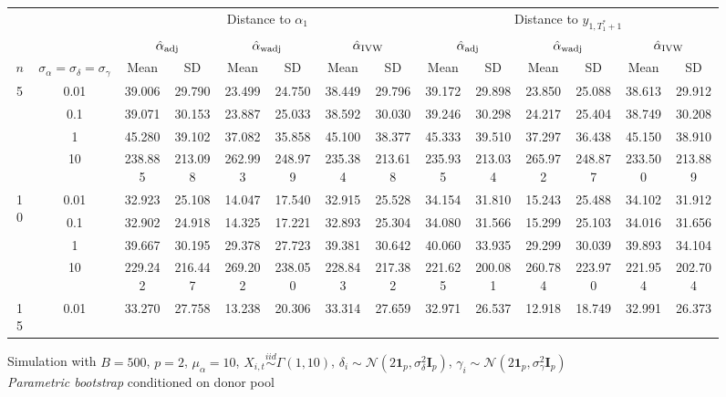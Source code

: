 \documentclass[11pt]{article}
\newcommand{\simiid}{\stackrel{iid}{\sim}} %
\def\normal#1#2{\mathcal{N}(#1,#2)} %
\theoremstyle{definition}
\begin{document}
\begin{sidewaysfigure}
\centering
\caption{Simulation  with $B = 500$, $p = 2$, $\mu_{\alpha}=10$, $X_{i,t} \simiid \Gamma(1,10)$, $\delta_i \sim \normal{2\mathbf{1}_p}{\sigma^2_{\delta}\mathbf{I}_p}$, $\gamma_i \sim \normal{2\mathbf{1}_p}{\sigma^2_{\gamma}\mathbf{I}_p}$ \\ \emph{Parametric bootstrap} conditioned on donor pool}
\begin{tabular}{cc|cccccc|cccccc}
  && \multicolumn{6}{c|}{Distance to $\alpha_1$}  & \multicolumn{6}{c}{Distance to $y_{1, T_1^*+1}$}  \\ 
   & & \multicolumn{2}{c}{$\hat{\alpha}_{\rm adj}$}  & \multicolumn{2}{c}{$\hat{\alpha}_{\rm wadj}$} & \multicolumn{2}{c|}{$\hat{\alpha}_{\rm IVW}$} & \multicolumn{2}{c}{$\hat{\alpha}_{\rm adj}$} & \multicolumn{2}{c}{$\hat{\alpha}_{\rm wadj}$}  & \multicolumn{2}{c}{$\hat{\alpha}_{\rm IVW}$}   \\ 
  $n$   & $\sigma_{\alpha} = \sigma_{\delta}=\sigma_{\gamma}$  & Mean & SD & Mean & SD & Mean & SD & Mean & SD & Mean & SD & Mean & SD  \\[.3cm]  
    \hline
 \multirow{4}{*}{5}  & 0.01 & 39.006 & 29.790 & 23.499 & 24.750 & 38.449 & 29.796 & 39.172 & 29.898 & 23.850 & 25.088 & 38.613 & 29.912 \\ 
    & 0.1 & 39.071 & 30.153 & 23.887 & 25.033 & 38.592 & 30.030 & 39.246 & 30.298 & 24.217 & 25.404 & 38.749 & 30.208 \\ 
   & 1   & 45.280 & 39.102 & 37.082 & 35.858 & 45.100 & 38.377 & 45.333 & 39.510 & 37.297 & 36.438 & 45.150 & 38.910 \\ 
   & 10   & 238.885 & 213.098 & 262.993 & 248.979 & 235.384 & 213.618 & 235.935 & 213.034 & 265.972 & 248.877 & 233.500 & 213.889 \\[.3cm]  
\multirow{4}{*}{10}   & 0.01 & 32.923 & 25.108 & 14.047 & 17.540 & 32.915 & 25.528 & 34.154 & 31.810 & 15.243 & 25.488 & 34.102 & 31.912 \\ 
  & 0.1 & 32.902 & 24.918 & 14.325 & 17.221 & 32.893 & 25.304 & 34.080 & 31.566 & 15.299 & 25.103 & 34.016 & 31.656 \\ 
   & 1   & 39.667 & 30.195 & 29.378 & 27.723 & 39.381 & 30.642 & 40.060 & 33.935 & 29.299 & 30.039 & 39.893 & 34.104 \\ 
 & 10   & 229.242 & 216.447 & 269.202 & 238.050 & 228.843 & 217.382 & 221.625 & 200.081 & 260.784 & 223.970 & 221.954 & 202.704\\[.3cm]  
\multirow{4}{*}{15}   & 0.01 & 33.270 & 27.758 & 13.238 & 20.306 & 33.314 & 27.659 & 32.971 & 26.537 & 12.918 & 18.749 & 32.991 & 26.373 \\ 

\end{tabular}
\end{sidewaysfigure}
\end{document}
